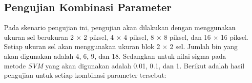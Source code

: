 
\subsection{Pengujian Kombinasi Parameter}
\noindent Pada skenario pengujian ini, pengujian akan dilakukan dengan menggunakan ukuran sel berukuran 2 $\times$ 2 piksel, 4 $\times$ 4 piksel, 8 $\times$ 8 piksel, dan 16 $\times$ 16 piksel. Setiap ukuran sel akan menggunakan ukuran blok 2 $\times$ 2 sel. Jumlah bin yang akan digunakan adalah 4, 6, 9, dan 18. Sedangkan untuk nilai sigma pada metode \textit{SVM} yang akan digunakan adalah 0.01, 0.1, dan 1. Berikut adalah hasil pengujian untuk setiap kombinasi parameter tersebut:


